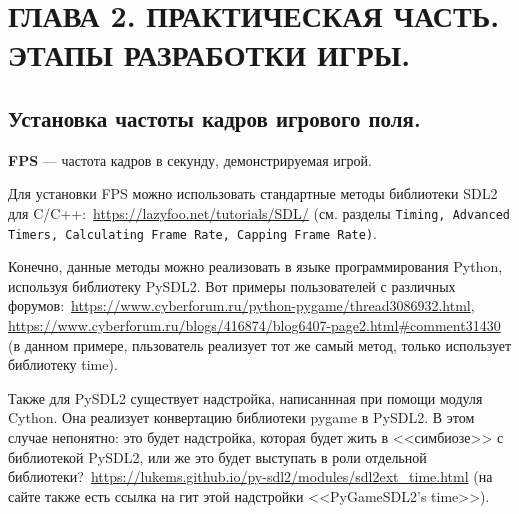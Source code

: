 \chapter{\label{ch:ch02}ГЛАВА 2. ПРАКТИЧЕСКАЯ ЧАСТЬ. ЭТАПЫ РАЗРАБОТКИ ИГРЫ.}

\section{\label{sec:ch02/sec01}Установка частоты кадров игрового поля.}
\textbf{FPS} --- частота кадров в секунду, демонстрируемая игрой.

Для установки FPS можно использовать стандартные методы библиотеки SDL2 для C/C++:~\url{https://lazyfoo.net/tutorials/SDL/} (см. разделы \texttt{Timing, Advanced Timers, Calculating Frame Rate, Capping Frame Rate)}.

Конечно, данные методы можно реализовать в языке программирования Python, используя библиотеку PySDL2. Вот примеры пользователей с различных форумов:~\url{https://www.cyberforum.ru/python-pygame/thread3086932.html}, \url{https://www.cyberforum.ru/blogs/416874/blog6407-page2.html#comment31430} (в данном примере, пльзователь реализует тот же самый метод, только использует библиотеку time).

Также для PySDL2 существует надстройка, написаннная при помощи модуля Cython. Она реализует конвертацию библиотеки pygame в PySDL2. В этом случае непонятно: это будет надстройка, которая будет жить в <<симбиозе>> с библиотекой PySDL2, или же это будет выступать в роли отдельной библиотеки?~\url{https://lukems.github.io/py-sdl2/modules/sdl2ext_time.html} (на сайте также есть ссылка на гит этой надстройки <<PyGameSDL2’s time>>).